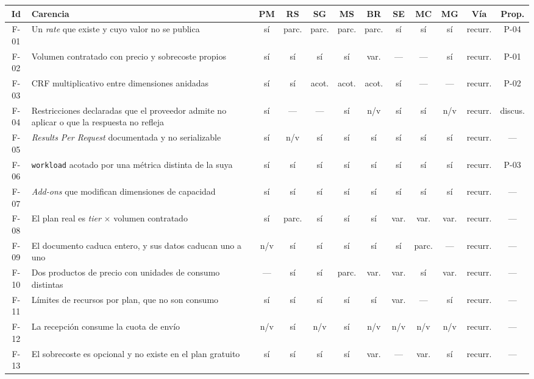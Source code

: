 \begin{table}[H]
\centering
\footnotesize
\setlength{\tabcolsep}{2.5pt}
\setlength{\abovecaptionskip}{3pt}
\begin{tabular}{|c|p{4.6cm}|c|c|c|c|c|c|c|c|c|c|}
\hline
\textbf{Id} & \textbf{Carencia} & \textbf{PM} & \textbf{RS} & \textbf{SG} & \textbf{MS} & \textbf{BR} & \textbf{SE} & \textbf{MC} & \textbf{MG} & \textbf{Vía} & \textbf{Prop.} \\
\hline
F-01 & Un \textit{rate} que existe y cuyo valor no se publica & sí & parc. & parc. & parc. & parc. & sí & sí & sí & recurr. & P-04 \\
\hline
F-02 & Volumen contratado con precio y sobrecoste propios & sí & sí & sí & sí & var. & --- & --- & sí & recurr. & P-01 \\
\hline
F-03 & CRF multiplicativo entre dimensiones anidadas & sí & sí & acot. & acot. & acot. & sí & --- & --- & recurr. & P-02 \\
\hline
F-04 & Restricciones declaradas que el proveedor admite no aplicar o que la respuesta no refleja & sí & --- & --- & sí & n/v & sí & sí & n/v & recurr. & discus. \\
\hline
F-05 & \textit{Results Per Request} documentada y no serializable & sí & n/v & sí & sí & sí & sí & sí & sí & recurr. & --- \\
\hline
F-06 & \texttt{workload} acotado por una métrica distinta de la suya & sí & sí & sí & sí & sí & sí & sí & sí & recurr. & P-03 \\
\hline
F-07 & \textit{Add-ons} que modifican dimensiones de capacidad & sí & sí & sí & sí & sí & sí & sí & sí & recurr. & --- \\
\hline
F-08 & El plan real es \textit{tier} $\times$ volumen contratado & sí & parc. & sí & sí & sí & var. & var. & var. & recurr. & --- \\
\hline
F-09 & El documento caduca entero, y sus datos caducan uno a uno & n/v & sí & sí & sí & sí & sí & parc. & --- & recurr. & --- \\
\hline
F-10 & Dos productos de precio con unidades de consumo distintas & --- & sí & sí & parc. & var. & var. & sí & var. & recurr. & --- \\
\hline
F-11 & Límites de recursos por plan, que no son consumo & sí & sí & sí & sí & sí & var. & --- & sí & recurr. & --- \\
\hline
F-12 & La recepción consume la cuota de envío & n/v & sí & n/v & sí & n/v & n/v & n/v & n/v & recurr. & --- \\
\hline
F-13 & El sobrecoste es opcional y no existe en el plan gratuito & sí & sí & sí & sí & var. & --- & var. & sí & recurr. & --- \\

\end{tabular}
\end{table}
